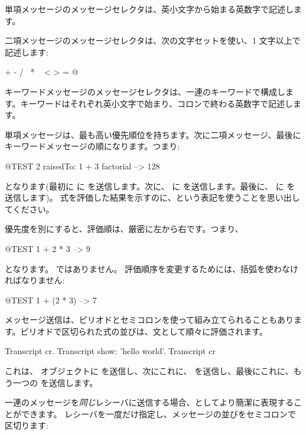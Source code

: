 \documentclass[a4paper,10pt,twoside]{book}
\begin{document}
単項メッセージのメッセージセレクタは、英小文字から始まる英数字で記述します。

二項メッセージのメッセージセレクタは、次の文字セットを使い、1 文字以上で記述します:
\begin{code}{}
+ - / \ * ~ < > = @ %
\end{code}
\noindent
キーワードメッセージのメッセージセレクタは、一連のキーワードで構成します。キーワードはそれぞれ英小文字で始まり、コロンで終わる英数字で記述します。

単項メッセージは、最も高い優先順位を持ちます。次に二項メッセージ、最後にキーワードメッセージの順になります。つまり:
\begin{code}{@TEST}
2 raisedTo: 1 + 3 factorial --> 128
\end{code}
となります(最初に  に  を送信します。次に、 に  を送信します。最後に、 に  を送信します)。
式を評価した結果を示すのに、\ct{-->}という表記を使うことを思い出してください。

優先度を別にすると、評価順は、厳密に左から右です。つまり、
\begin{code}{@TEST}
1 + 2 * 3 --> 9
\end{code}
となります。 ではありません。
評価順序を変更するためには、括弧を使わなければなりません:
\begin{code}{@TEST}
1 + (2 * 3) --> 7
\end{code}

メッセージ送信は、ピリオドとセミコロンを使って組み立てられることもあります。ピリオドで区切られた式の並びは、文として順々に評価されます。

\begin{code}{}
Transcript cr.
Transcript show: 'hello world'.
Transcript cr
\end{code}

\noindent
これは、 オブジェクトに  を送信し、次にこれに、 を送信し、最後にこれに、もう一つの  を送信します。

一連のメッセージを\emph{同じ}レシーバに送信する場合、としてより簡潔に表現することができます。
レシーバを一度だけ指定し、メッセージの並びをセミコロンで区切ります:
\end{document}
